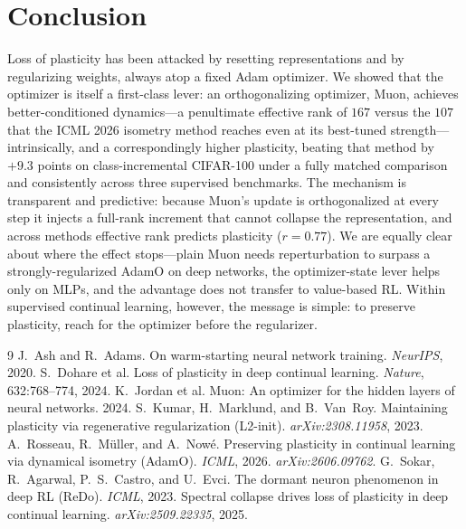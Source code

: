 \documentclass[letterpaper,twocolumn,10pt]{article}
\begin{document}
\section{Conclusion}
Loss of plasticity has been attacked by resetting representations and by regularizing weights, always atop a fixed Adam optimizer. We showed that the optimizer is itself a first-class lever: an orthogonalizing optimizer, Muon, achieves better-conditioned dynamics---a penultimate effective rank of $167$ versus the $107$ that the ICML 2026 isometry method reaches even at its best-tuned strength---intrinsically, and a correspondingly higher plasticity, beating that method by $+9.3$ points on class-incremental CIFAR-100 under a fully matched comparison and consistently across three supervised benchmarks. The mechanism is transparent and predictive: because Muon's update is orthogonalized at every step it injects a full-rank increment that cannot collapse the representation, and across methods effective rank predicts plasticity ($r{=}0.77$). We are equally clear about where the effect stops---plain Muon needs reperturbation to surpass a strongly-regularized AdamO on deep networks, the optimizer-state lever helps only on MLPs, and the advantage does not transfer to value-based RL. Within supervised continual learning, however, the message is simple: to preserve plasticity, reach for the optimizer before the regularizer.


\begin{thebibliography}{9}
 J.~Ash and R.~Adams. On warm-starting neural network training. \emph{NeurIPS}, 2020.
 S.~Dohare et al. Loss of plasticity in deep continual learning. \emph{Nature}, 632:768--774, 2024.
 K.~Jordan et al. Muon: An optimizer for the hidden layers of neural networks. 2024.
 S.~Kumar, H.~Marklund, and B.~Van~Roy. Maintaining plasticity via regenerative regularization (L2-init). \emph{arXiv:2308.11958}, 2023.
 A.~Rosseau, R.~M\"uller, and A.~Now\'e. Preserving plasticity in continual learning via dynamical isometry (AdamO). \emph{ICML}, 2026. \emph{arXiv:2606.09762}.
 G.~Sokar, R.~Agarwal, P.~S.~Castro, and U.~Evci. The dormant neuron phenomenon in deep RL (ReDo). \emph{ICML}, 2023.
 Spectral collapse drives loss of plasticity in deep continual learning. \emph{arXiv:2509.22335}, 2025.
\end{thebibliography}
\end{document}
